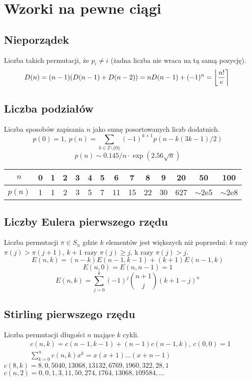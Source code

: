 \section{Wzorki na pewne ciągi}
	\subsection{Nieporządek}
		Liczba takich permutacji, że $p_i \neq i$ (żadna liczba nie wraca na tą samą pozycję).
		\[ \mkern-2mu D(n) = (n-1)(D(n-1)+D(n-2)) = n D(n-1)+(-1)^n = \left\lfloor\frac{n!}{e}\right\rceil \]

	\subsection{Liczba podziałów}
		Liczba sposobów zapisania $n$ jako sumę posortowanych liczb dodatnich.
		\[ p(0) = 1,\ p(n) = \sum_{k \in \mathbb Z \setminus \{0\}}{(-1)^{k+1} p(n - k(3k-1) / 2)} \]
		\[ p(n) \sim 0.145 / n \cdot \exp(2.56 \sqrt{n}) \]

		\begin{center}
		\begin{tabular}{c|c@{\ }c@{\ }c@{\ }c@{\ }c@{\ }c@{\ }c@{\ }c@{\ }c@{\ }c@{\ }c@{\ }c@{\ }c}
			$n$    & 0 & 1 & 2 & 3 & 4 & 5 & 6  & 7  & 8  & 9  & 20  & 50  & 100 \\ \hline
			$p(n)$ & 1 & 1 & 2 & 3 & 5 & 7 & 11 & 15 & 22 & 30 & 627 & $\mathtt{\sim}$2e5 & $\mathtt{\sim}$2e8 \\
		\end{tabular}
		\end{center}

	\subsection{Liczby Eulera pierwszego rzędu}
		Liczba permutacji $\pi \in S_n$ gdzie $k$ elementów jest większych niż poprzedni: $k$ razy $\pi(j)>\pi(j+1)$, $k+1$ razy $\pi(j)\geq j$, k razy $\pi(j)>j$.
		$$E(n,k) = (n-k)E(n-1,k-1) + (k+1)E(n-1,k)$$
		$$E(n,0) = E(n,n-1) = 1$$
		$$E(n,k) = \sum_{j=0}^k(-1)^j\binom{n+1}{j}(k+1-j)^n$$

	\subsection{Stirling pierwszego rzędu}
		Liczba permutacji długości $n$ mające $k$ cykli.
		\begin{align*}
			&c(n,k) = c(n-1,k-1) + (n-1) c(n-1,k),\ c(0,0) = 1 \\
			&\textstyle \sum_{k=0}^n c(n,k)x^k = x(x+1) \dots (x+n-1)
		\end{align*}
		$c(8,k) = 8, 0, 5040, 13068, 13132, 6769, 1960, 322, 28, 1$ \\
		$c(n,2) = 0, 0, 1, 3, 11, 50, 274, 1764, 13068, 109584, \dots$

